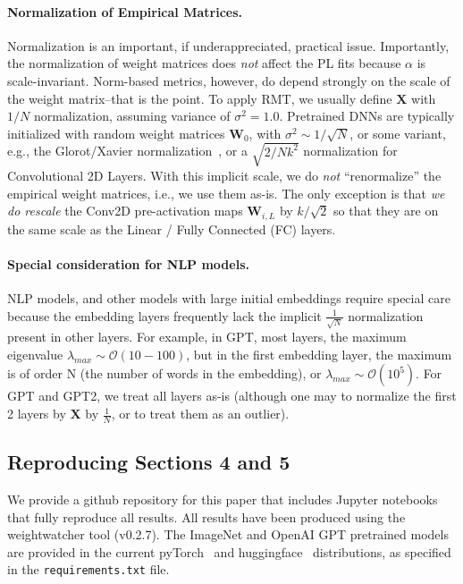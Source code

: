 \paragraph{Normalization of Empirical Matrices.}  
Normalization is an important, if underappreciated, practical issue.
Importantly, the normalization of weight matrices does \emph{not} affect the PL fits because $\alpha$ is scale-invariant.
Norm-based metrics, however, do depend strongly on the scale of the weight matrix--that is the point.
To apply RMT, we usually define $\mathbf{X}$ with $1/N$ normalization, assuming variance of $\sigma^{2}=1.0$.
Pretrained DNNs are typically initialized with random weight matrices $\mathbf{W}_{0}$, with
 $\sigma^{2}\sim 1/\sqrt{N}$, or some variant, e.g., the Glorot/Xavier normalization~\cite{GloBen10}, or a $\sqrt{2/Nk^2}$ normalization for Convolutional 2D Layers. With this implicit scale, 
we do \emph{not} ``renormalize'' the empirical weight matrices, i.e., we use them as-is.
The only exception is that \emph{we do rescale} the Conv2D pre-activation maps $\mathbf{W}_{i,L}$ 
by $k/\sqrt{2}$ so that they are on the same scale as the Linear / Fully Connected (FC) layers.

\paragraph{Special consideration for NLP models.}
NLP models, and other models with large initial embeddings require special care because the
embedding layers frequently lack the implicit $\frac{1}{\sqrt{N}}$ normalization present in other layers.
For example, in GPT, most layers, the maximum eigenvalue $\lambda_{max}\sim\mathcal{O}(10-100)$,
but in the first embedding layer, the maximum is of order N (the number of words in the embedding), or
 $\lambda_{max}\sim\mathcal{O}(10^{5})$.  For GPT and GPT2, we treat all layers as-is (although one may to normalize
the first 2 layers by  $\mathbf{X}$ by $\frac{1}{N}$, or to treat them as an outlier).

\subsection{Reproducing Sections 4 and 5}

We provide a github repository for this paper that includes Jupyter notebooks that fully reproduce all results.
All results have been produced using the weightwatcher tool (v0.2.7).
The ImageNet and OpenAI GPT pretrained models are provided in the current 
pyTorch~\cite{pytorch} and huggingface~\cite{huggingface} distributions, as specified in the \texttt{requirements.txt} file. 

